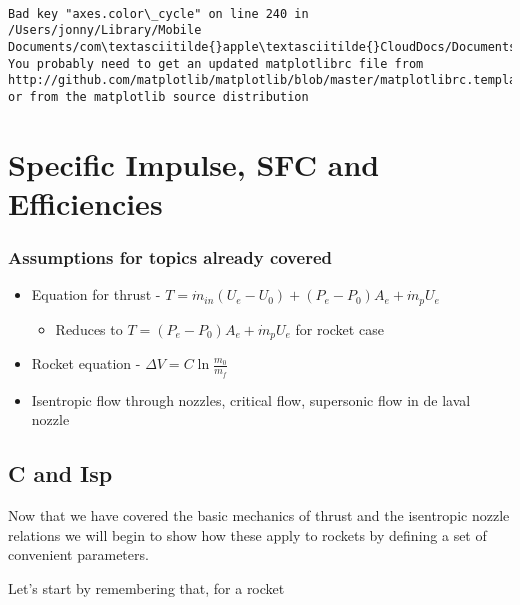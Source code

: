 \documentclass[11pt]{article}
\providecommand{\tightlist}{%
      \setlength{\itemsep}{0pt}\setlength{\parskip}{0pt}}
\begin{document}
    \begin{Verbatim}[commandchars=\\\{\}]

Bad key "axes.color\_cycle" on line 240 in
/Users/jonny/Library/Mobile Documents/com\textasciitilde{}apple\textasciitilde{}CloudDocs/Documents/YHayPi/aa103/matplotlibrc.
You probably need to get an updated matplotlibrc file from
http://github.com/matplotlib/matplotlib/blob/master/matplotlibrc.template
or from the matplotlib source distribution

    \end{Verbatim}

    \section{Specific Impulse, SFC and
Efficiencies}\label{specific-impulse-sfc-and-efficiencies}

\subsubsection{Assumptions for topics already
covered}\label{assumptions-for-topics-already-covered}

\begin{itemize}
\tightlist
\item
  Equation for thrust -
  \(T = \dot{m}_{in}(U_e - U_0) + (P_e - P_0)A_e + \dot{m}_pU_e\)

  \begin{itemize}
  \tightlist
  \item
    Reduces to \(T = (P_e - P_0)A_e + \dot{m}_pU_e\) for rocket case
  \end{itemize}
\item
  Rocket equation - \(\Delta V = C \ln \frac{m_0}{m_f}\)
\item
  Isentropic flow through nozzles, critical flow, supersonic flow in de
  laval nozzle
\end{itemize}

\subsection{C and Isp}\label{c-and-isp}

Now that we have covered the basic mechanics of thrust and the
isentropic nozzle relations we will begin to show how these apply to
rockets by defining a set of convenient parameters.

Let's start by remembering that, for a rocket
\end{document}
